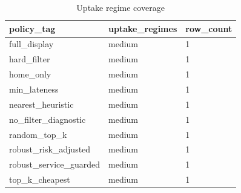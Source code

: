 \begin{table}[ht]
\centering
\begin{tabular}{lll}
 \hline
policy\_tag & uptake\_regimes & row\_count \\
 \hline
full\_display & medium & 1 \\
hard\_filter & medium & 1 \\
home\_only & medium & 1 \\
min\_lateness & medium & 1 \\
nearest\_heuristic & medium & 1 \\
no\_filter\_diagnostic & medium & 1 \\
random\_top\_k & medium & 1 \\
robust\_risk\_adjusted & medium & 1 \\
robust\_service\_guarded & medium & 1 \\
top\_k\_cheapest & medium & 1 \\
 \hline
\end{tabular}
\caption{Uptake regime coverage}
\end{table}
